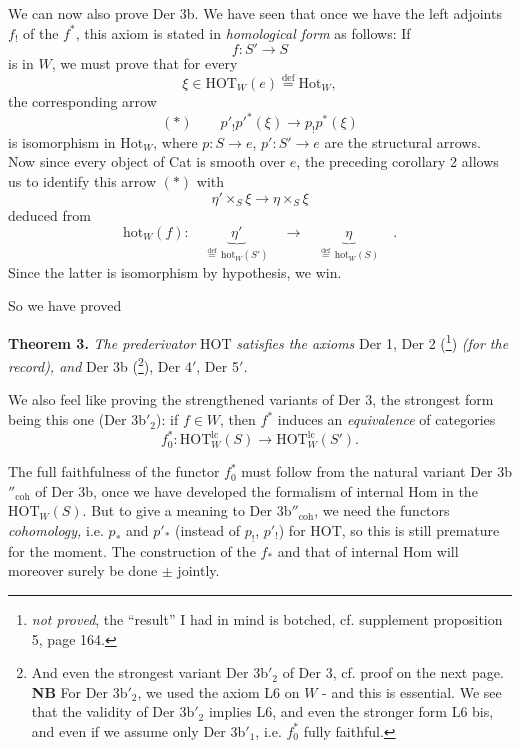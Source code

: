 \documentclass[11pt]{article}
\newcommand{\msp}[1]{\marginpar{\footnotesize [#1]}}
\newcommand{\hot}{\mathrm{hot}}
\newcommand{\HOT}{\mathrm{HOT}}
\begin{document}
We can now also prove Der 3b. We have seen that once we have the left adjoints $f_!$ of the $f^*$, this axiom is stated in \textit{homological form} as follows: If
\[f : S'\longrightarrow S\]
is in $W$, we must prove that for every
\[\xi\in\HOT_W(e)\overset{\text{def}}{=}\mathrm{Hot}_W,\]
the corresponding arrow
\[(*)\qquad p'_!p'^*(\xi)\longrightarrow p_!p^*(\xi)\]
is isomorphism in $\mathrm{Hot}_W$, where $p : S\longrightarrow e$, $p' : S'\longrightarrow e$ are the structural arrows. Now since every object of Cat is smooth over $e$, the preceding corollary 2 allows us to identify this arrow $(*)$ with
\[\eta'\times_S\xi\longrightarrow\eta\times_S\xi\]
\msp{159}
deduced from
\[\hot_W(f) :\quad\underbrace{\ \eta'\ }_{\overset{\text{def}}{=}\,\hot_W(S')}\quad\longrightarrow\quad\underbrace{\ \eta\ }_{\overset{\text{def}}{=}\,\hot_W(S)}\quad.\]
Since the latter is isomorphism by hypothesis, we win.

So we have proved

\textbf{Theorem 3.} \textit{The prederivator} HOT \textit{satisfies the axioms} Der 1, Der 2 (\footnote[76]{\textit{not proved}, the ``result'' I had in mind is botched, cf. supplement proposition 5, page 164.}) \textit{(for the record), and} Der 3b (\footnote[77]{And even the strongest variant Der 3b$'_2$ of Der 3, cf. proof on the next page. \textbf{NB} For Der 3b$'_2$, we used the axiom L6 on $W$ - and this is essential. We see that the validity of Der 3b$'_2$ implies L6, and even the stronger form L6 bis, and even if we assume only Der 3b$'_1$, i.e. $f_0^*$ fully faithful.}), Der 4$'$, Der 5$'$\textit{.} %

We also feel like proving the strengthened variants of Der 3, the strongest form being this one (Der 3b$'_2$): if $f\in W$, then $f^*$ induces an \textit{equivalence} of categories
\[f_0^* : \HOT^{\mathrm{lc}}_W(S)\longrightarrow\HOT^{\mathrm{lc}}_W(S').\]

The full faithfulness of the functor $f_0^*$ must follow from the natural variant Der 3b$''_{\mathrm{coh}}$ of Der 3b, once we have developed the formalism of internal Hom in the $\HOT_W(S)$. But to give a meaning to Der 3b$''_{\mathrm{coh}}$, we need the functors \textit{cohomology,} i.e. $p_*$ and $p'_*$ (instead of $p_!$, $p'_!$) for HOT, so this is still premature for the moment. The construction of the $f_*$ and that of internal Hom will moreover surely be done $\pm$ jointly.
\end{document}
